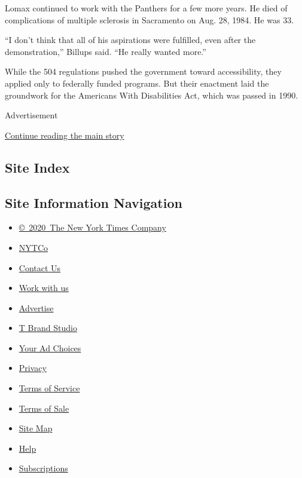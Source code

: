 Lomax continued to work with the Panthers for a few more years. He died
of complications of multiple sclerosis in Sacramento on Aug. 28, 1984.
He was 33.

``I don't think that all of his aspirations were fulfilled, even after
the demonstration,'' Billups said. ``He really wanted more.''

While the 504 regulations pushed the government toward accessibility,
they applied only to federally funded programs. But their enactment laid
the groundwork for the Americans With Disabilities Act, which was passed
in 1990.

Advertisement

\protect\hyperlink{after-bottom}{Continue reading the main story}

\hypertarget{site-index}{%
\subsection{Site Index}\label{site-index}}

\hypertarget{site-information-navigation}{%
\subsection{Site Information
Navigation}\label{site-information-navigation}}

\begin{itemize}
\tightlist
\item
  \href{https://help.nytimes.com/hc/en-us/articles/115014792127-Copyright-notice}{©~2020~The
  New York Times Company}
\end{itemize}

\begin{itemize}
\tightlist
\item
  \href{https://www.nytco.com/}{NYTCo}
\item
  \href{https://help.nytimes.com/hc/en-us/articles/115015385887-Contact-Us}{Contact
  Us}
\item
  \href{https://www.nytco.com/careers/}{Work with us}
\item
  \href{https://nytmediakit.com/}{Advertise}
\item
  \href{http://www.tbrandstudio.com/}{T Brand Studio}
\item
  \href{https://www.nytimes.com/privacy/cookie-policy\#how-do-i-manage-trackers}{Your
  Ad Choices}
\item
  \href{https://www.nytimes.com/privacy}{Privacy}
\item
  \href{https://help.nytimes.com/hc/en-us/articles/115014893428-Terms-of-service}{Terms
  of Service}
\item
  \href{https://help.nytimes.com/hc/en-us/articles/115014893968-Terms-of-sale}{Terms
  of Sale}
\item
  \href{https://spiderbites.nytimes.com}{Site Map}
\item
  \href{https://help.nytimes.com/hc/en-us}{Help}
\item
  \href{https://www.nytimes.com/subscription?campaignId=37WXW}{Subscriptions}
\end{itemize}
